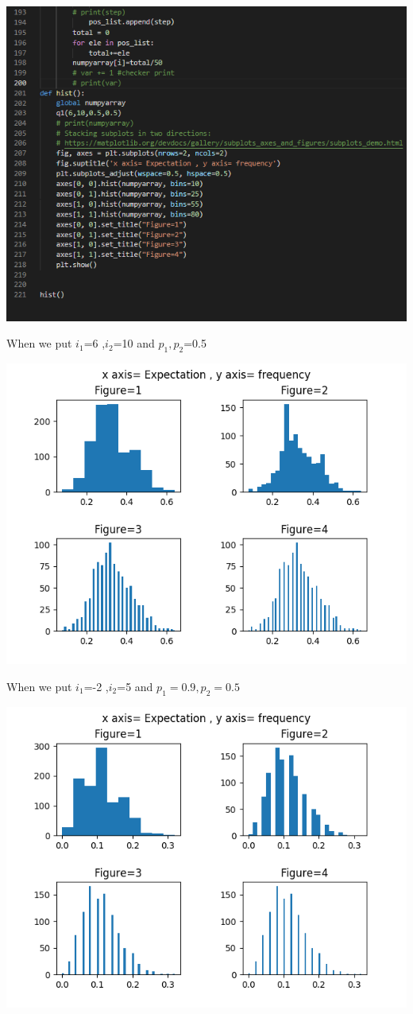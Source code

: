 \documentclass[answers]{exam}
\begin{document}
\begin{framed}
\begin{center}
\includegraphics[scale=0.7]{task1.3_d.PNG}
\end{center}
When we put $i_{1}$=6 ,$i_{2}$=10 and $p_{1},p_{2}$=0.5
\begin{center}
    \includegraphics[scale=0.75]{hist1.3_a.png}
\end{center}
When we put $i_{1}$=-2 ,$i_{2}$=5 and $p_{1} = 0.9 ,p_{2}=0.5$
\begin{center}
    \includegraphics[scale=0.7]{hist1.3_b.png}

\end{center}
\end{framed}
\end{document}

